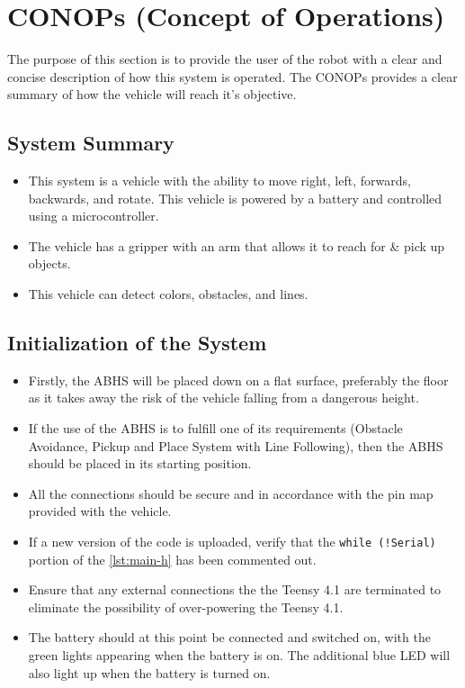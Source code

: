 \documentclass[11pt]{report}
\begin{document}
\chapter{CONOPs (Concept of Operations)}\label{ch:conops}
The purpose of this section is to provide the user of the robot with a clear and concise description of how this system is operated. The \gls{CONOP}s provides a clear summary of how the vehicle will reach it's objective. 
\section{System Summary}
\begin{itemize}
    \item This system is a vehicle with the ability to move right, left, forwards, backwards, and rotate. This vehicle is powered by a battery and controlled using a microcontroller.
    \item The vehicle has a gripper with an arm that allows it to reach for \& pick up objects. 
    \item This vehicle can detect colors, obstacles, and lines.
\end{itemize}
\section{Initialization of the System}
\begin{itemize}
    \item Firstly, the \gls{ABHS} will be placed down on a flat surface, preferably the floor as it takes away the risk of the vehicle falling from a dangerous height.
    \item If the use of the \gls{ABHS} is to fulfill one of its requirements (Obstacle Avoidance, Pickup and Place System with Line Following), then the \gls{ABHS} should be placed in its starting position.
    \item All the connections should be secure and in accordance with the pin map provided with the vehicle.
    \item If a new version of the code is uploaded, verify that the \texttt{while (!Serial)} portion of the \cref{lst:main-h} has been commented out.
    \item Ensure that any external connections the the Teensy 4.1 are terminated to eliminate the possibility of over-powering the Teensy 4.1.
    \item The battery should at this point be connected and switched on, with the green lights appearing when the battery is on. The additional blue \gls{LED} will also light up when the battery is turned on.
\end{itemize}
\end{document}
